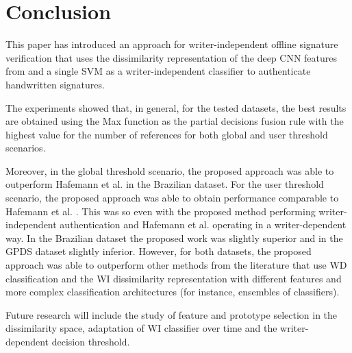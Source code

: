 \documentclass[conference]{IEEEtran}
\begin{document}

\section{Conclusion}
\label{sec:conclusion}
This paper has introduced an approach for writer-independent offline signature verification that uses the dissimilarity representation of the deep CNN features from \cite{hafemann:17} and a single SVM as a writer-independent classifier to authenticate handwritten signatures. 

The experiments showed that, in general, for the tested datasets, the best results are obtained using the Max function as the partial decisions fusion rule with the highest value for the number of references for both global and user threshold scenarios.

Moreover, in the global threshold scenario, the proposed approach was able to outperform Hafemann et al. \cite{hafemann:17} in the Brazilian dataset. For the user threshold scenario, the proposed approach was able to obtain performance comparable to Hafemann et al. \cite{hafemann:17}. This was so even with the proposed method performing writer-independent authentication and Hafemann et al. \cite{hafemann:17} operating in a writer-dependent way. In the Brazilian dataset the proposed work was slightly superior and in the GPDS dataset slightly inferior. However, for both datasets, the proposed approach was able to outperform other methods from the literature that use WD classification and the WI dissimilarity representation with different features and more complex classification architectures (for instance, ensembles of classifiers). 

Future research will include the study of feature and prototype selection in the dissimilarity space, adaptation of WI classifier over time and the writer-dependent decision threshold. 

%
%
 


\end{document}
